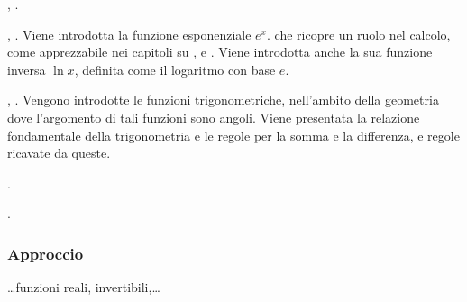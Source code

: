 \documentclass[letterpaper,10pt,italian]{jupyterBook}
\begin{document}
\sphinxAtStartPar
{\hyperref[\detokenize{ch/precalculus/multivariable-real-fun:math-hs-precalculus-multivariable-real-fun}]{}}, . 

\sphinxAtStartPar
{\hyperref[\detokenize{ch/exponential_logarithm:math-hs-exp-log}]{}}, . Viene introdotta la funzione esponenziale \(e^x\). che ricopre un ruolo  nel calcolo, come apprezzabile nei capitoli su {\hyperref[\detokenize{ch/infinitesimal_calculus/derivatives:infinitesimal-calculus-derivatives}]{}}, {\hyperref[\detokenize{ch/infinitesimal_calculus/integrals:infinitesimal-calculus-integrals}]{}} e {\hyperref[\detokenize{ch/ode:ode-hs}]{}}.
Viene introdotta anche la sua funzione inversa \(\ln x\), definita come il logaritmo con base \(e\).

\sphinxAtStartPar
{\hyperref[\detokenize{ch/trigonometry:math-hs-trigonometry}]{}}, . Vengono introdotte le funzioni trigonometriche, nell’ambito della geometria dove l’argomento di tali funzioni sono angoli. Viene presentata la relazione fondamentale della trigonometria e le regole per la somma e la differenza, e regole ricavate da queste.

\sphinxAtStartPar
{\hyperref[\detokenize{ch/precalculus/polynomials:math-hs-precalculus-polynomials}]{}}. 

\sphinxAtStartPar
{\hyperref[\detokenize{ch/algebra/complex-algebra:math-hs-algebra-complex}]{}}. 
\subsubsection*{Approccio}

\sphinxAtStartPar
…funzioni reali, invertibili,…
\end{document}
